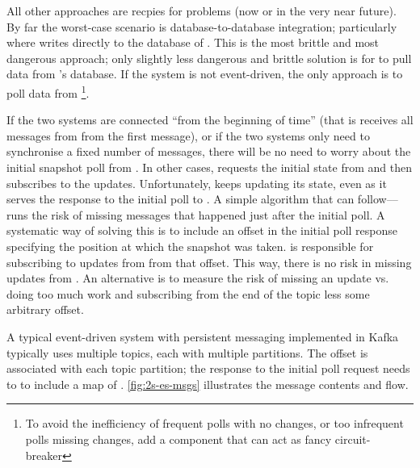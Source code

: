 

All other approaches are recpies for problems (now or in the very near future). By far the worst-case scenario is database-to-database integration; particularly where  writes directly to the database of . This is the most brittle and most dangerous approach; only slightly less dangerous and brittle solution is for  to pull data from 's database. If the system  is not event-driven, the only approach is to poll data from \footnote{To avoid the inefficiency of frequent polls with no changes, or too infrequent polls missing changes, add a component that can act as fancy circuit-breaker}. 

If the two systems are connected ``from the beginning of time'' (that is  receives all messages from  from the first message), or if the two systems only need to synchronise a fixed number of messages, there will be no need to worry about the initial snapshot poll from . In other cases,  requests the initial state from  and then subscribes to the updates. Unfortunately,  keeps updating its state, even as it serves the response to the initial poll to . A simple algorithm that  can follow----runs the risk of missing messages that happened just after the initial poll. A systematic way of solving this is to include an offset in the initial poll response specifying the position at which the snapshot was taken.  is responsible for subscribing to updates from  from that offset. This way, there is no risk in missing updates from . An alternative is to measure the risk of missing an update vs. doing too much work and subscribing from the end of the topic less some arbitrary offset.

A typical event-driven system with persistent messaging implemented in Kafka typically uses multiple topics, each with multiple partitions. The offset is associated with each topic partition; the response to the initial poll request needs to to include a map of . \autoref{fig:2s-es-msgs} illustrates the message contents and flow.

